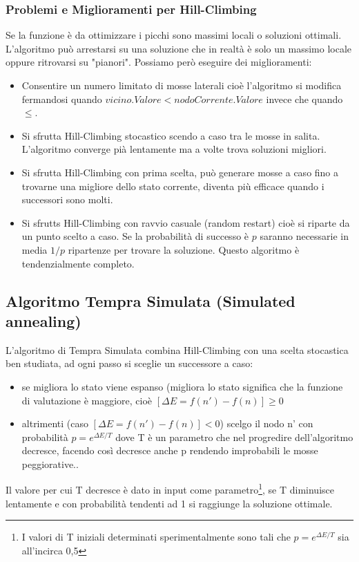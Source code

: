 \documentclass{article}
\begin{document}
\subsubsection{Problemi e Miglioramenti per Hill-Climbing}
Se la funzione è da ottimizzare i picchi sono massimi locali o soluzioni ottimali. L'algoritmo può arrestarsi su una soluzione che in realtà è solo un massimo locale oppure ritrovarsi su "pianori". Possiamo però eseguire dei miglioramenti:
\begin{itemize}
    \item Consentire un numero limitato di mosse laterali cioè l'algoritmo si modifica fermandosi quando $vicino.Valore < nodoCorrente.Valore$ invece che quando $\leq$.
    \item Si sfrutta Hill-Climbing stocastico scendo a caso tra le mosse in salita. L'algoritmo converge pià lentamente ma a volte trova soluzioni migliori.
    \item Si sfrutta Hill-Climbing con prima scelta, può generare mosse a caso fino a trovarne una migliore dello stato corrente, diventa più efficace quando i successori sono molti.
    \item Si sfrutts Hill-Climbing con ravvio casuale (random restart) cioè si riparte da un punto scelto a caso. Se la probabilità di successo è $p$ saranno necessarie in media $1/p$ ripartenze per trovare la soluzione. Questo algoritmo è tendenzialmente completo.
\end{itemize}

\subsection{Algoritmo Tempra Simulata (Simulated annealing)}
L'algoritmo di Tempra Simulata combina Hill-Climbing con una scelta stocastica ben studiata, ad ogni passo si sceglie un successore a caso:
\begin{itemize}
    \item se migliora lo stato viene espanso (migliora lo stato significa che la funzione di valutazione è maggiore, cioè $[\Delta E = f(n')-f(n)] \geq 0$
    \item altrimenti (caso $[\Delta E = f(n')-f(n)] < 0$) scelgo il nodo n' con probabilità $p=e^{\Delta E / T}$ dove T è un parametro che nel progredire dell'algoritmo decresce, facendo così decresce anche p rendendo improbabili le mosse peggiorative..
\end{itemize}
Il valore per cui T decresce è dato in input come parametro\footnote{I valori di T iniziali determinati sperimentalmente sono tali che $p=e^{\Delta E / T}$ sia all'incirca 0,5}, se T diminuisce lentamente e con probabilità tendenti ad 1 si raggiunge la soluzione ottimale.
\end{document}
